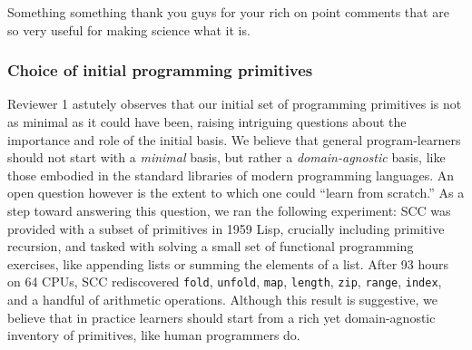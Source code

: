 \documentclass{article}
\begin{document}
Something something thank you guys for your rich on point comments that are so
very useful for making science what it is.

\subsubsection*{Choice of initial programming primitives}

Reviewer 1 astutely observes that our initial set of programming primitives is
not as minimal as it could have been,
raising intriguing questions
about the importance and role of the initial basis.
We believe that general program-learners should not start with a \emph{minimal} basis,
but rather a \emph{domain-agnostic}
basis,
like those embodied in the standard libraries of modern programming languages.
An open question however is the extent to which one could ``learn from scratch.''
As a step toward answering this question,
we ran the following experiment:
SCC was provided with a subset of primitives in 1959 Lisp, crucially including primitive recursion,
and tasked with solving a small set of functional programming exercises, like appending lists or summing the elements of a list.
After 93 hours on 64 CPUs,
SCC rediscovered \texttt{fold}, \texttt{unfold}, \texttt{map},
\texttt{length}, \texttt{zip}, \texttt{range}, \texttt{index},
and a handful of arithmetic operations.
Although this result is suggestive,
we believe that in practice learners should start from a rich yet domain-agnostic
inventory of primitives, like human programmers do.



\end{document}
